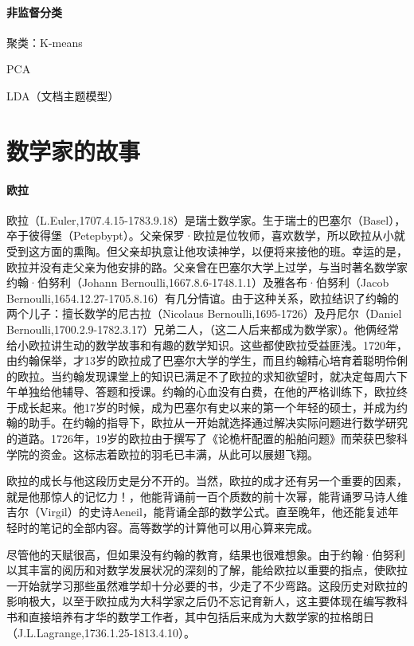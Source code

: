 \documentclass[UTF8]{ctexbook}
\begin{document}
\subsection{非监督分类}

聚类：K-means

PCA

LDA（文档主题模型）

\part{数学家的故事}

\subsection{欧拉}

欧拉（L.Euler,1707.4.15-1783.9.18）是瑞士数学家。生于瑞士的巴塞尔（Basel），卒于彼得堡（Petepbypt）。父亲保罗·欧拉是位牧师，喜欢数学，所以欧拉从小就受到这方面的熏陶。但父亲却执意让他攻读神学，以便将来接他的班。幸运的是，欧拉并没有走父亲为他安排的路。父亲曾在巴塞尔大学上过学，与当时著名数学家约翰·伯努利（Johann Bernoulli,1667.8.6-1748.1.1）及雅各布·伯努利（Jacob Bernoulli,1654.12.27-1705.8.16）有几分情谊。由于这种关系，欧拉结识了约翰的两个儿子：擅长数学的尼古拉（Nicolaus Bernoulli,1695-1726）及丹尼尔（Daniel Bernoulli,1700.2.9-1782.3.17）兄弟二人，（这二人后来都成为数学家）。他俩经常给小欧拉讲生动的数学故事和有趣的数学知识。这些都使欧拉受益匪浅。1720年，由约翰保举，才13岁的欧拉成了巴塞尔大学的学生，而且约翰精心培育着聪明伶俐的欧拉。当约翰发现课堂上的知识已满足不了欧拉的求知欲望时，就决定每周六下午单独给他辅导、答题和授课。约翰的心血没有白费，在他的严格训练下，欧拉终于成长起来。他17岁的时候，成为巴塞尔有史以来的第一个年轻的硕士，并成为约翰的助手。在约翰的指导下，欧拉从一开始就选择通过解决实际问题进行数学研究的道路。1726年，19岁的欧拉由于撰写了《论桅杆配置的船舶问题》而荣获巴黎科学院的资金。这标志着欧拉的羽毛已丰满，从此可以展翅飞翔。

欧拉的成长与他这段历史是分不开的。当然，欧拉的成才还有另一个重要的因素，就是他那惊人的记忆力！，他能背诵前一百个质数的前十次幂，能背诵罗马诗人维吉尔（Virgil）的史诗Aeneil，能背诵全部的数学公式。直至晚年，他还能复述年轻时的笔记的全部内容。高等数学的计算他可以用心算来完成。

尽管他的天赋很高，但如果没有约翰的教育，结果也很难想象。由于约翰·伯努利以其丰富的阅历和对数学发展状况的深刻的了解，能给欧拉以重要的指点，使欧拉一开始就学习那些虽然难学却十分必要的书，少走了不少弯路。这段历史对欧拉的影响极大，以至于欧拉成为大科学家之后仍不忘记育新人，这主要体现在编写教科书和直接培养有才华的数学工作者，其中包括后来成为大数学家的拉格朗日（J.L.Lagrange,1736.1.25-1813.4.10）。
\end{document}
